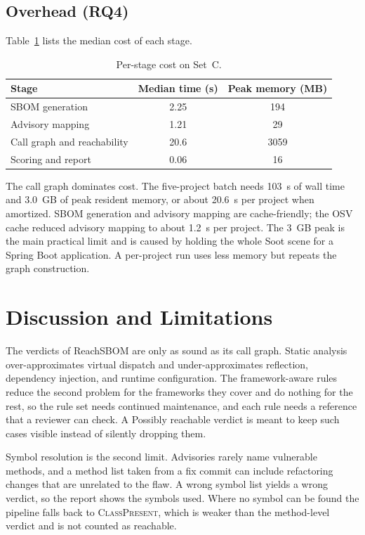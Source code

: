 \documentclass[conference]{IEEEtran}
\begin{document}
\subsection{Overhead (RQ4)}
Table~\ref{tab:overhead} lists the median cost of each stage.

\begin{table}[t]
\caption{Per-stage cost on Set~C.}
\label{tab:overhead}
\centering
\footnotesize
\renewcommand{\arraystretch}{1.1}
\setlength{\tabcolsep}{3pt}
\begin{tabular}{@{}lcc@{}}
\toprule
Stage & Median time (s) & Peak memory (MB) \\
\midrule
SBOM generation & 2.25 & 194 \\
Advisory mapping & 1.21 & 29 \\
Call graph and reachability & 20.6 & 3059 \\
Scoring and report & 0.06 & 16 \\
\bottomrule
\end{tabular}
\end{table}

The call graph dominates cost. The five-project batch needs 103~s of wall time and 3.0~GB of peak resident memory, or about 20.6~s per project when amortized. SBOM generation and advisory mapping are cache-friendly; the OSV cache reduced advisory mapping to about 1.2~s per project. The 3~GB peak is the main practical limit and is caused by holding the whole Soot scene for a Spring Boot application. A per-project run uses less memory but repeats the graph construction.

\section{Discussion and Limitations}\label{sec:discussion}
The verdicts of ReachSBOM are only as sound as its call graph. Static analysis over-approximates virtual dispatch and under-approximates reflection, dependency injection, and runtime configuration. The framework-aware rules reduce the second problem for the frameworks they cover and do nothing for the rest, so the rule set needs continued maintenance, and each rule needs a reference that a reviewer can check. A Possibly reachable verdict is meant to keep such cases visible instead of silently dropping them.

Symbol resolution is the second limit. Advisories rarely name vulnerable methods, and a method list taken from a fix commit can include refactoring changes that are unrelated to the flaw. A wrong symbol list yields a wrong verdict, so the report shows the symbols used. Where no symbol can be found the pipeline falls back to \textsc{ClassPresent}, which is weaker than the method-level verdict and is not counted as reachable.
\end{document}

